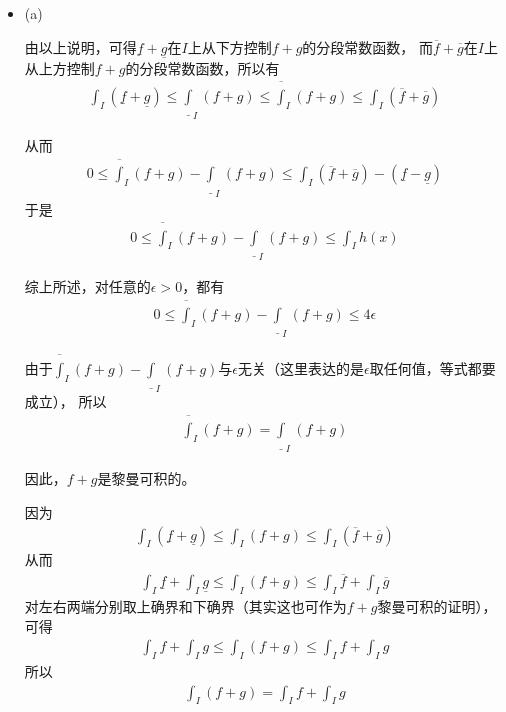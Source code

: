 \documentclass{article}
\begin{document}
\begin{itemize}
  \item (a)

        由以上说明，可得$\underline{f} + \underline{g}$在$I$上从下方控制$f + g$的分段常数函数，
        而$\overline{f} + \overline{g}$在$I$上从上方控制$f + g$的分段常数函数，所以有
        \begin{align*}
          \int_{I} (\underline{f} + \underline{g}) \leq \underline{\int}_I (f + g) \leq \overline{\int}_I (f + g) \leq \int_I (\overline{f} + \overline{g})
        \end{align*}

        从而
        \begin{align*}
          0 \leq \overline{\int}_I (f + g) - \underline{\int}_I (f + g) \leq \int_I (\overline{f} + \overline{g}) -  (\underline{f} - \underline{g})
        \end{align*}
        于是
        \begin{align*}
          0 \leq \overline{\int}_I (f + g) - \underline{\int}_I (f + g) \leq \int_I h(x)
        \end{align*}

        综上所述，对任意的$\epsilon > 0$，都有
        \begin{align*}
          0 \leq \overline{\int}_I (f + g) - \underline{\int}_I (f + g) \leq 4\epsilon
        \end{align*}

        由于$\overline{\int}_I (f + g) - \underline{\int}_I (f + g)$与$\epsilon$无关（这里表达的是$\epsilon$取任何值，等式都要成立），
        所以
        \begin{align*}
          \overline{\int}_I (f + g) = \underline{\int}_I (f + g)
        \end{align*}

        因此，$f + g$是黎曼可积的。

        因为
        \begin{align*}
          \int_{I} (\underline{f} + \underline{g}) \leq \int_I (f + g) \leq \int_I (\overline{f} + \overline{g})
        \end{align*}
        从而
        \begin{align*}
          \int_{I} \underline{f} + \int_{I}\underline{g} \leq \int_I (f + g) \leq \int_I \overline{f} + \int_I \overline{g}
        \end{align*}
        对左右两端分别取上确界和下确界（其实这也可作为$f+g$黎曼可积的证明），可得
        \begin{align*}
          \int_{I} f + \int_{I} g \leq \int_I (f + g) \leq \int_I f + \int_I g
        \end{align*}
        所以
        \begin{align*}
          \int_I (f + g) = \int_I f + \int_I g
        \end{align*}



\end{itemize}
\end{document}
